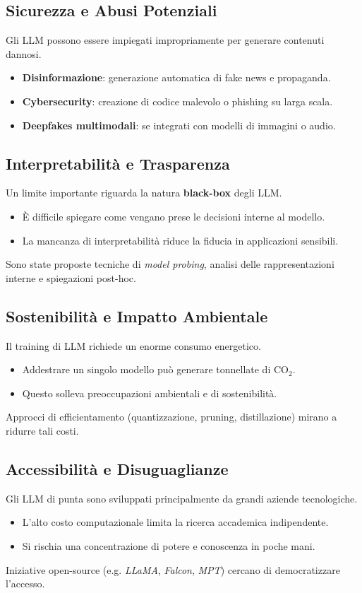 \subsection{Sicurezza e Abusi Potenziali}
Gli LLM possono essere impiegati impropriamente per generare contenuti dannosi.
\begin{itemize}
    \item \textbf{Disinformazione}: generazione automatica di fake news e propaganda.
    \item \textbf{Cybersecurity}: creazione di codice malevolo o phishing su larga scala.
    \item \textbf{Deepfakes multimodali}: se integrati con modelli di immagini o audio.
\end{itemize}

\subsection{Interpretabilità e Trasparenza}
Un limite importante riguarda la natura \textbf{black-box} degli LLM.
\begin{itemize}
    \item È difficile spiegare come vengano prese le decisioni interne al modello.
    \item La mancanza di interpretabilità riduce la fiducia in applicazioni sensibili.
\end{itemize}
Sono state proposte tecniche di \textit{model probing}, analisi delle rappresentazioni interne e spiegazioni post-hoc.

\subsection{Sostenibilità e Impatto Ambientale}
Il training di LLM richiede un enorme consumo energetico.
\begin{itemize}
    \item Addestrare un singolo modello può generare tonnellate di CO$_2$.
    \item Questo solleva preoccupazioni ambientali e di sostenibilità.
\end{itemize}
Approcci di efficientamento (quantizzazione, pruning, distillazione) mirano a ridurre tali costi.

\subsection{Accessibilità e Disuguaglianze}
Gli LLM di punta sono sviluppati principalmente da grandi aziende tecnologiche.
\begin{itemize}
    \item L'alto costo computazionale limita la ricerca accademica indipendente.
    \item Si rischia una concentrazione di potere e conoscenza in poche mani.
\end{itemize}
Iniziative open-source (e.g. \textit{LLaMA}, \textit{Falcon}, \textit{MPT}) cercano di democratizzare l'accesso.

